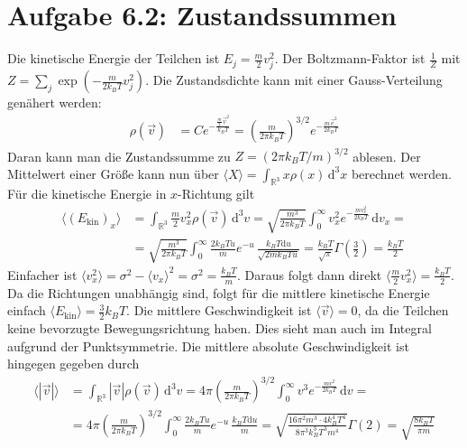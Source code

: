 \documentclass[a4paper,12pt]{article}
\newcommand{\bra}{}
\newcommand{\intx}{}
\newcommand{\intr}{}
\newcommand{\kla}{}
\newcommand{\tecxt}{}
\begin{document}
\section*{Aufgabe 6.2: Zustandssummen}
Die kinetische Energie der Teilchen ist $E_j=\frac{m}{2}v_j^2$. Der Boltzmann-Faktor ist $\frac{1}{Z}$ mit $Z=\sum_j\exp\kla\left( {-\frac{m}{2k_BT}v_j^2} \right)$. Die Zustandsdichte kann mit einer Gauss-Verteilung genähert werden:
\begin{align*}
\rho(\vec{v})&=Ce^{-\frac{\frac{m}{2}\vec{v}^2}{k_BT}}=\kla\left( {\frac{m}{2\pi k_BT}} \right)^{3/2}e^{-\frac{m\vec{v}^2}{2k_BT}}
\end{align*}
Daran kann man die Zustandssumme zu $Z=(2\pi k_BT/m)^{3/2}$ ablesen. Der Mittelwert einer Größe kann nun über $\bra\langle {X}\rangle=\intr\int_{\mathbb{R}^{3}}{x\rho(x)}\,\mathrm{d}^{3}x$ berechnet werden. Für die kinetische Energie in $x$-Richtung gilt
\begin{align*}
\bra\langle {(E_\tecxt\text{kin})_x}\rangle&=\intr\int_{\mathbb{R}^{3}}{\frac{m}{2}v_x^2\rho(\vec{v})}\,\mathrm{d}^{3}v=\sqrt{\frac{m^3}{2\pi k_BT}}\intx\int_{0}^{\infty}v_x^2e^{-\frac{mv_x^2}{2k_BT}}\,\mathrm{d}v_x=\\
&=\sqrt{\frac{m^3}{2\pi k_BT}}\intx\int_{0}^{\infty}\frac{2k_BTu}{m}e^{-u}\,\frac{k_BT\mathrm{d}u}{\sqrt{2mk_BTu}}=\frac{k_BT}{\sqrt{\pi}}\Gamma\kla\left( {\frac{3}{2}} \right)=\frac{k_BT}{2}
\end{align*}
Einfacher ist $\bra\langle {v_x^2}\rangle=\sigma^2-\bra\langle {v_x}\rangle^2=\sigma^2=\frac{k_BT}{m}$. Daraus folgt dann direkt $\bra\langle {\frac{m}{2}v_x^2}\rangle=\frac{k_BT}{2}$. Da die Richtungen unabhängig sind, folgt für die mittlere kinetische Energie einfach $\bra\langle {E_\tecxt\text{kin}}\rangle=\frac{3}{2}k_BT$. Die mittlere Geschwindigkeit ist $\bra\langle {\vec{v}}\rangle=0$, da die Teilchen keine bevorzugte Bewegungsrichtung haben. Dies sieht man auch im Integral aufgrund der Punktsymmetrie. Die mittlere absolute Geschwindigkeit ist hingegen gegeben durch
\begin{align*}
\bra\langle {|\vec{v}|}\rangle&=\intr\int_{\mathbb{R}^{3}}{|\vec{v}|\rho(\vec{v})}\,\mathrm{d}^{3}v=4\pi\kla\left( {\frac{m}{2\pi k_BT}} \right)^{3/2}\intx\int_{0}^{\infty}v^3e^{-\frac{mv^2}{2k_BT}}\,\mathrm{d}v=\\
&=4\pi\kla\left( {\frac{m}{2\pi k_BT}} \right)^{3/2}\intx\int_{0}^{\infty}\frac{2k_BTu}{m}e^{-u}\,\frac{k_BT\mathrm{d}u}{m}=\sqrt{\frac{16\pi^2m^3\cdot 4k_B^4T^4}{8\pi^3k_B^3T^3m^4}}\Gamma(2)=\sqrt{\frac{8k_BT}{\pi m}}
\end{align*}
\end{document}
